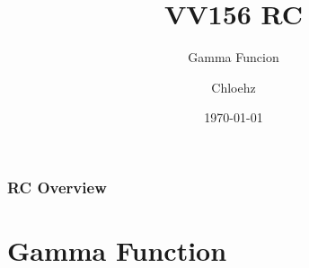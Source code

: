 \documentclass[
	11pt, %
]{beamer}
\title{VV156 RC} %
\subtitle{Gamma Funcion} %
\author{Chloehz} %
\institute{UM-SJTU Joint Institute} %
\date{\today} %
\begin{document}

\begin{frame}
	\titlepage %
\end{frame}



\begin{frame}
	\frametitle{RC Overview} %
	
	\tableofcontents %
\end{frame}



\section{Gamma Function}
\begin{frame}
    \transfade
	\tableofcontents[sectionstyle=show/shaded,subsectionstyle=show/shaded]
\end{frame}
\end{document}
